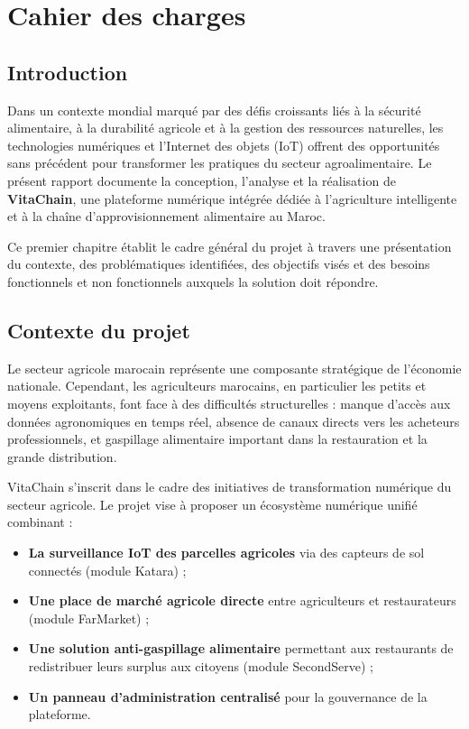 \documentclass[12pt,a4paper]{report}
\begin{document}
\chapter{Cahier des charges}

\section{Introduction}

Dans un contexte mondial marqué par des défis croissants liés à la sécurité alimentaire,
à la durabilité agricole et à la gestion des ressources naturelles, les technologies
numériques et l'Internet des objets (IoT) offrent des opportunités sans précédent pour
transformer les pratiques du secteur agroalimentaire. Le présent rapport documente la
conception, l'analyse et la réalisation de \textbf{VitaChain}, une plateforme numérique
intégrée dédiée à l'agriculture intelligente et à la chaîne d'approvisionnement
alimentaire au Maroc.

Ce premier chapitre établit le cadre général du projet à travers une présentation du
contexte, des problématiques identifiées, des objectifs visés et des besoins fonctionnels
et non fonctionnels auxquels la solution doit répondre.

\section{Contexte du projet}

Le secteur agricole marocain représente une composante stratégique de l'économie nationale.
Cependant, les agriculteurs marocains, en particulier les petits et moyens exploitants,
font face à des difficultés structurelles : manque d'accès aux données agronomiques en
temps réel, absence de canaux directs vers les acheteurs professionnels, et gaspillage
alimentaire important dans la restauration et la grande distribution.

VitaChain s'inscrit dans le cadre des initiatives de transformation numérique du secteur
agricole. Le projet vise à proposer un écosystème numérique unifié combinant :

\begin{itemize}
  \item \textbf{La surveillance IoT des parcelles agricoles} via des capteurs de sol
        connectés (module Katara) ;
  \item \textbf{Une place de marché agricole directe} entre agriculteurs et restaurateurs
        (module FarMarket) ;
  \item \textbf{Une solution anti-gaspillage alimentaire} permettant aux restaurants de
        redistribuer leurs surplus aux citoyens (module SecondServe) ;
  \item \textbf{Un panneau d'administration centralisé} pour la gouvernance de la
        plateforme.
\end{itemize}
\end{document}
